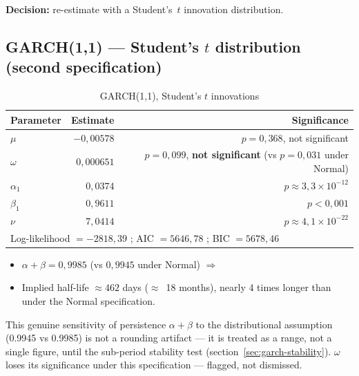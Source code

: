 \documentclass[12pt,a4paper]{article}
\begin{document}
\textbf{Decision:} re-estimate with a Student's~$t$
innovation distribution.

\vspace{0.6cm}

\subsection{GARCH(1,1) --- Student's $t$ distribution (second specification)}

\begin{table}[H]
	\centering
	\caption{GARCH(1,1), Student's $t$ innovations}
	\begin{tabular}{lrr}
		\toprule
		Parameter & Estimate & Significance \\
		\midrule
		$\mu$ & $-0{,}00578$ & $p=0{,}368$, not significant \\
		$\omega$ & $0{,}000651$ & $p=0{,}099$, \textbf{not significant} (vs $p=0{,}031$ under Normal) \\
		$\alpha_1$ & $0{,}0374$ & $p \approx 3{,}3\times10^{-12}$ \\
		$\beta_1$ & $0{,}9611$ & $p<0{,}001$ \\
		$\nu$ & $7{,}0414$ & $p \approx 4{,}1\times10^{-22}$ \\
		\midrule
		\multicolumn{3}{l}{Log-likelihood $=-2818{,}39$ ; AIC $=5646{,}78$ ; BIC $=5678{,}46$} \\
		\bottomrule
	\end{tabular}
\end{table}

\begin{itemize}
	\item $\alpha+\beta = 0{,}9985$ (vs $0{,}9945$ under Normal) $\Rightarrow$
	\item Implied half-life $\approx 462$ days ($\approx$~18 months), nearly 4 times longer than under the Normal specification.
\end{itemize}

\vspace{0.3cm}

\begin{limitbox}
	This genuine sensitivity of persistence $\alpha+\beta$ to
	the distributional assumption (0.9945 vs 0.9985) is not a
	rounding artifact --- it is treated as a range, not a single
	figure, until the sub-period stability test
	(section~\ref{sec:garch-stability}). $\omega$ loses its significance
	under this specification --- flagged, not dismissed.
\end{limitbox}
\end{document}
